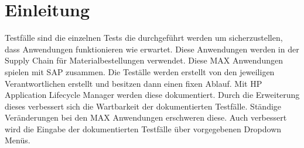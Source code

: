 \chapter*{Einleitung}

\label{Einleitung}
Testfälle sind die einzelnen Tests die durchgeführt werden um sicherzustellen, dass Anwendungen funktionieren wie erwartet. 
Diese Anwendungen werden in der Supply Chain für Materialbestellungen verwendet. Diese MAX Anwendungen spielen mit SAP zusammen. 
Die Teställe werden erstellt von den jeweiligen Verantwortlichen erstellt und
besitzen dann einen fixen Ablauf. Mit HP Application Lifecycle Manager werden diese dokumentiert.
Durch die Erweiterung dieses verbessert sich die Wartbarkeit der dokumentierten Testfälle. Ständige Veränderungen bei den MAX Anwendungen erschweren diese. Auch verbessert wird die Eingabe der dokumentierten Testfälle über vorgegebenen Dropdown Menüs.

